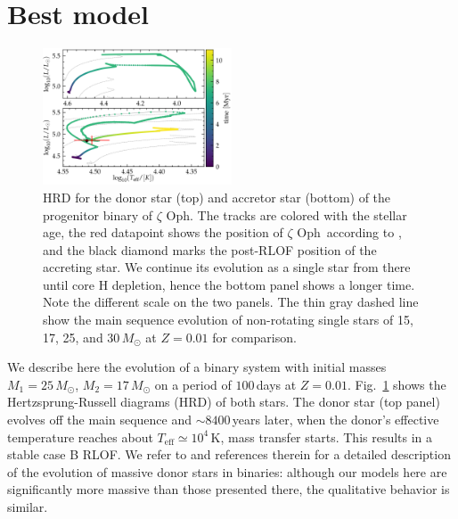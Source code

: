 \documentclass[twocolumn,twocolappendix,trackchanges]{aastex63}
\DeclareRobustCommand{\Figref}[1]{Fig.~\ref{#1}}
\newcommand{\zoph}{$\zeta$ Oph}
\begin{document}
\section{Best model}
\label{sec:best_model}

\begin{figure}[htbp]
  \includegraphics[width=0.5\textwidth]{HRD_both}
  \caption{HRD for the donor star (top) and
    accretor star (bottom) of the progenitor binary of \zoph. The
    tracks are colored with the stellar age, the
    red datapoint shows the position of \zoph\ according to
    \cite{villamariz:05}, and the black diamond marks the post-RLOF
    position of the accreting star. We continue its evolution as a single star from
    there until core H depletion, hence the bottom panel shows a longer
    time. Note the different scale on the two panels. The thin gray
    dashed line show the main sequence evolution of non-rotating
    single stars of 15, 17, 25, and 30\,$M_\odot$ at $Z=0.01$ for comparison.}
  \label{fig:HRD_both}
\end{figure}


We describe here the evolution of a binary system with initial masses
$M_1=25\,M_\odot$, $M_2=17\,M_\odot$ on a period of $100$\,days at
$Z=0.01$. \Figref{fig:HRD_both} shows the Hertzsprung-Russell diagrams (HRD)
of both stars. The donor star (top panel) evolves off the main
sequence and $\sim8400$\,years later, when the donor's effective
temperature reaches about $T_\mathrm{eff}\simeq 10^4$\,K, mass transfer starts. This
results in a stable case B RLOF. We refer to \cite{gotberg:17, laplace:21, blagorodnova:21}
and references therein for a detailed description of the evolution of
massive donor stars in binaries: although our models here are
significantly more massive than those presented there, the qualitative behavior is similar.
\end{document}
